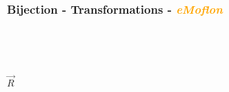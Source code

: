 \documentclass{beamer}
\begin{document}
\begin{frame}
\frametitle{Bijection - \textbf{Transformations} - \textbf{\textit{\textcolor{orange}{eMoflon}}}}
\begin{figure}[ht]
\begin{mdframed}
    \centering
    \mbox{\qquad\qquad\qquad
          }
\end{mdframed}          
    \label{fig:T1}
\end{figure}
~\\

\begin{center}
$\overrightarrow{R}$
\end{center}

\begin{figure}[ht]
    \centering
    \mbox{
          }
    \label{fig:T5}
\end{figure}

\end{frame}
\end{document}
